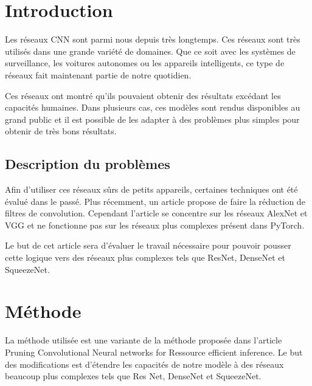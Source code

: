\documentclass[12pt]{article}
\begin{document}
\section*{Introduction}
Les réseaux CNN sont parmi nous depuis très longtemps\cite{lecunn1}. Ces réseaux sont très utilisés dans une grande variété de domaines. Que ce soit avec les systèmes de surveillance, les voitures autonomes ou les appareils intelligents, ce type de réseaux fait maintenant partie de notre quotidien\cite{daily}.

Ces réseaux ont montré qu’ils pouvaient obtenir des résultats excédant les capacités humaines\cite{beathuman}. Dans plusieurs cas, ces modèles sont rendus disponibles au grand public et il est possible de les adapter à des problèmes plus simples pour obtenir de très bons résultats\cite{transfer}. 

\subsection{Description du problèmes}
Afin d'utiliser ces réseaux sûrs de petits appareils, certaines techniques\cite{han1} ont été évalué dans le passé. Plus récemment, un article propose de faire la réduction de filtres de convolution\cite{molchanov}. Cependant l'article se concentre sur les réseaux AlexNet et VGG et ne fonctionne pas sur les réseaux plus complexes présent dans PyTorch\cite{pytorchmodel}.

Le but de cet article sera d'évaluer le travail nécessaire pour pouvoir pousser cette logique vers des réseaux plus complexes tels que ResNet, DenseNet et SqueezeNet. 

\section*{Méthode}
\setcounter{subsection}{0}
La méthode utilisée est une variante de la méthode proposée dans l'article Pruning Convolutional Neural networks for Ressource efficient inference\cite{molchanov}. Le but des modifications est d'étendre les capacités de notre modèle à des réseaux beaucoup plus complexes tels que Res Net, DenseNet et SqueezeNet. 
\end{document}
